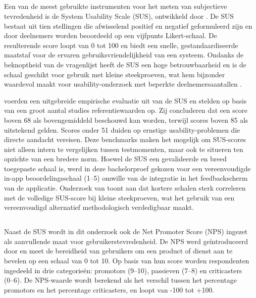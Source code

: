 \subsection{}
Een van de meest gebruikte instrumenten voor het meten van subjectieve tevredenheid is de System Usability Scale (SUS), ontwikkeld door \textcite{Brooke1996}. De SUS bestaat uit tien stellingen die afwisselend positief en negatief geformuleerd zijn en door deelnemers worden beoordeeld op een vijfpunts Likert-schaal. De resulterende score loopt van 0 tot 100 en biedt een snelle, gestandaardiseerde maatstaf voor de ervaren gebruiksvriendelijkheid van een systeem. Ondanks de beknoptheid van de vragenlijst heeft de SUS een hoge betrouwbaarheid en is de schaal geschikt voor gebruik met kleine steekproeven, wat hem bijzonder waardevol maakt voor usability-onderzoek met beperkte deelnemersaantallen \autocite{Bangor2008}.

\textcite{Bangor2008} voerden een uitgebreide empirische evaluatie uit van de SUS en stelden op basis van een groot aantal studies referentiewaarden op. Zij concluderen dat een score boven 68 als bovengemiddeld beschouwd kan worden, terwijl scores boven 85 als uitstekend gelden. Scores onder 51 duiden op ernstige usability-problemen die directe aandacht vereisen. Deze benchmarks maken het mogelijk om SUS-scores niet alleen intern te vergelijken tussen testmomenten, maar ook te situeren ten opzichte van een bredere norm. Hoewel de SUS een gevalideerde en breed toegepaste schaal is, werd in deze bachelorproef gekozen voor een vereenvoudigde in-app beoordelingsschaal (1–5) omwille van de integratie in het feedbackscherm van de applicatie. Onderzoek van \textcite{SauroLewis2016} toont aan dat kortere schalen sterk correleren met de volledige SUS-score bij kleine steekproeven, wat het gebruik van een vereenvoudigd alternatief methodologisch verdedigbaar maakt.

\subsection{}
Naast de SUS wordt in dit onderzoek ook de Net Promoter Score (NPS) ingezet als aanvullende maat voor gebruikerstevredenheid. De NPS werd geïntroduceerd door \textcite{Reichheld2003} en meet de bereidheid van gebruikers om een product of dienst aan te bevelen op een schaal van 0 tot 10. Op basis van hun score worden respondenten ingedeeld in drie categorieën: promotors (9–10), passieven (7–8) en criticasters (0–6). De NPS-waarde wordt berekend als het verschil tussen het percentage promotors en het percentage criticasters, en loopt van -100 tot +100.

